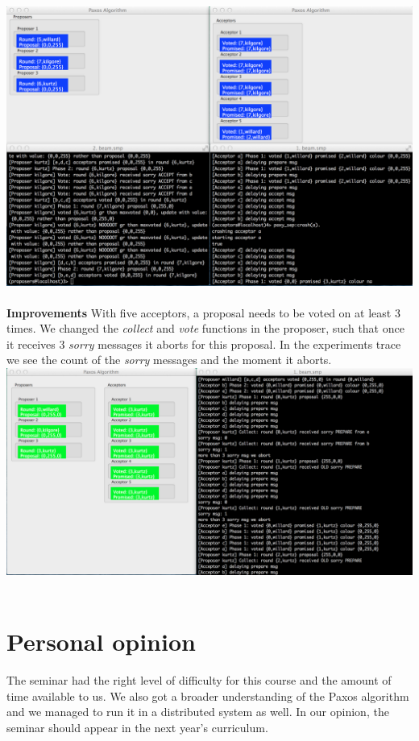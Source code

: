 \documentclass[a4paper, 11pt]{article}
\begin{document}
\includegraphics[scale=0.35]{images/exp11.png} \\\\

\textbf{Improvements}
With five acceptors, a proposal needs to be voted on at least 3 times. We changed the \textit{collect} and \textit{vote} functions in the proposer, such that once it receives 3 \textit{sorry} messages it aborts for this proposal. In the experiments trace we see the count of the \textit{sorry} messages and the moment it aborts.\\
\includegraphics[scale=0.35]{images/exp12.png} \\\\

\section{Personal opinion}

The seminar had the right level of difficulty for this course and the amount of time available to us. We also got a broader understanding of the Paxos algorithm and we managed to run it in a distributed system as well. In our opinion, the seminar should appear in the next year's curriculum.
\end{document}
